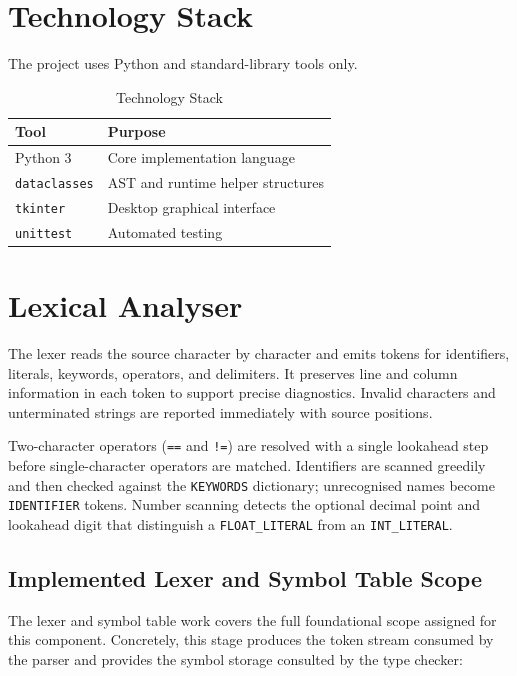 \section{Technology Stack}
The project uses Python and standard-library tools only.

\begin{table}[H]
\centering
\caption{Technology Stack}
\begin{tabular}{ll}
\toprule
Tool & Purpose \\
\midrule
Python 3 & Core implementation language \\
\texttt{dataclasses} & AST and runtime helper structures \\
\texttt{tkinter} & Desktop graphical interface \\
\texttt{unittest} & Automated testing \\
\bottomrule
\end{tabular}
\end{table}

\section{Lexical Analyser}
The lexer reads the source character by character and emits tokens for
identifiers, literals, keywords, operators, and delimiters. It preserves line
and column information in each token to support precise diagnostics. Invalid
characters and unterminated strings are reported immediately with source
positions.

Two-character operators (\texttt{==} and \texttt{!=}) are resolved with a
single lookahead step before single-character operators are matched. Identifiers
are scanned greedily and then checked against the \texttt{KEYWORDS} dictionary;
unrecognised names become \texttt{IDENTIFIER} tokens. Number scanning detects
the optional decimal point and lookahead digit that distinguish a
\texttt{FLOAT\_LITERAL} from an \texttt{INT\_LITERAL}.

\subsection{Implemented Lexer and Symbol Table Scope}
The lexer and symbol table work covers the full foundational scope assigned for
this component. Concretely, this stage produces the token stream consumed by the
parser and provides the symbol storage consulted by the type checker:

